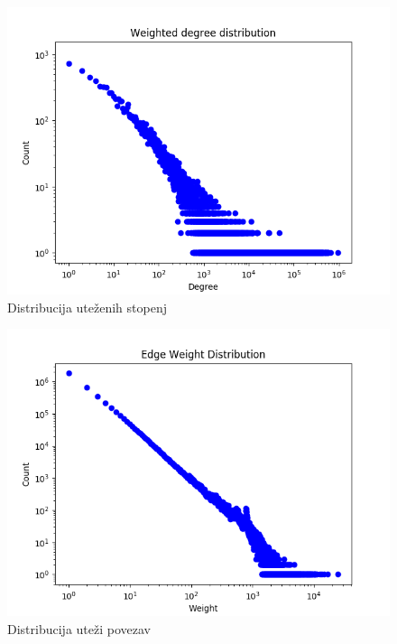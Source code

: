 \documentclass[a4paper,12pt]{article}
\begin{document}
	\begin{figure}[H]
		\centering
		\includegraphics[scale=0.7]{graph_degrees}
		\caption{Distribucija uteženih stopenj}
	\end{figure}

	\begin{figure}[H]
		\centering
		\includegraphics[scale=0.7]{graph_edge_weights}
		\caption{Distribucija uteži povezav}
	\end{figure}
\end{document}
